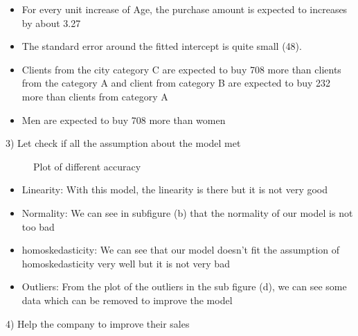 \documentclass[11pt,a4paper]{article}
\begin{document}
\begin{itemize}
	\item For every unit increase of Age, the purchase amount is expected to increases by about 3.27
	\item The standard error around the fitted intercept is quite small (48).
	\item Clients from the city category C are expected to buy 708 more than clients from the category A and client from category B are expected to buy 232 more than clients from category A
	\item Men are expected to buy 708 more than women
\end{itemize}
3) Let check if all the assumption about the model met


\begin{figure}[H]
	\centering
	
	\caption{Plot of different accuracy}\label{fig:trapez}
\end{figure}


\begin{itemize}
	\item Linearity:  With this model, the linearity is there but it is not very good
	\item Normality: We can see in subfigure (b) that the normality of our model is not too bad
	\item homoskedasticity: We can see that our model doesn't fit the assumption of homoskedasticity very well but it is not very bad 
	\item Outliers: From the plot of the outliers in the sub figure (d), we can see some data which can be removed to improve the model
\end{itemize}
4) Help the company to improve their sales
\end{document}
